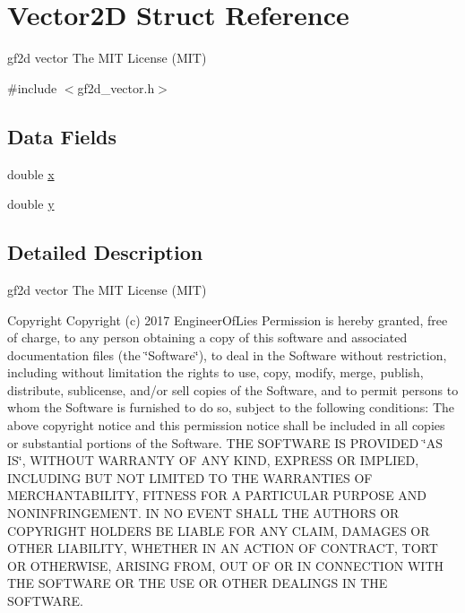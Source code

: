 \hypertarget{struct_vector2_d}{}\section{Vector2D Struct Reference}
\label{struct_vector2_d}


gf2d vector  The M\+IT License (M\+IT)  




{\ttfamily \#include $<$gf2d\+\_\+vector.\+h$>$}

\subsection*{Data Fields}
\begin{DoxyCompactItemize}
\item 
double \hyperlink{struct_vector2_d_af88b946fb90d5f08b5fb740c70e98c10}{x}
\item 
double \hyperlink{struct_vector2_d_ab927965981178aa1fba979a37168db2a}{y}
\end{DoxyCompactItemize}


\subsection{Detailed Description}
gf2d vector  The M\+IT License (M\+IT) 

\begin{DoxyCopyright}{Copyright}
Copyright (c) 2017 Engineer\+Of\+Lies Permission is hereby granted, free of charge, to any person obtaining a copy of this software and associated documentation files (the \char`\"{}\+Software\char`\"{}), to deal in the Software without restriction, including without limitation the rights to use, copy, modify, merge, publish, distribute, sublicense, and/or sell copies of the Software, and to permit persons to whom the Software is furnished to do so, subject to the following conditions\+: The above copyright notice and this permission notice shall be included in all copies or substantial portions of the Software. T\+HE S\+O\+F\+T\+W\+A\+RE IS P\+R\+O\+V\+I\+D\+ED \char`\"{}\+A\+S I\+S\char`\"{}, W\+I\+T\+H\+O\+UT W\+A\+R\+R\+A\+N\+TY OF A\+NY K\+I\+ND, E\+X\+P\+R\+E\+SS OR I\+M\+P\+L\+I\+ED, I\+N\+C\+L\+U\+D\+I\+NG B\+UT N\+OT L\+I\+M\+I\+T\+ED TO T\+HE W\+A\+R\+R\+A\+N\+T\+I\+ES OF M\+E\+R\+C\+H\+A\+N\+T\+A\+B\+I\+L\+I\+TY, F\+I\+T\+N\+E\+SS F\+OR A P\+A\+R\+T\+I\+C\+U\+L\+AR P\+U\+R\+P\+O\+SE A\+ND N\+O\+N\+I\+N\+F\+R\+I\+N\+G\+E\+M\+E\+NT. IN NO E\+V\+E\+NT S\+H\+A\+LL T\+HE A\+U\+T\+H\+O\+RS OR C\+O\+P\+Y\+R\+I\+G\+HT H\+O\+L\+D\+E\+RS BE L\+I\+A\+B\+LE F\+OR A\+NY C\+L\+A\+IM, D\+A\+M\+A\+G\+ES OR O\+T\+H\+ER L\+I\+A\+B\+I\+L\+I\+TY, W\+H\+E\+T\+H\+ER IN AN A\+C\+T\+I\+ON OF C\+O\+N\+T\+R\+A\+CT, T\+O\+RT OR O\+T\+H\+E\+R\+W\+I\+SE, A\+R\+I\+S\+I\+NG F\+R\+OM, O\+UT OF OR IN C\+O\+N\+N\+E\+C\+T\+I\+ON W\+I\+TH T\+HE S\+O\+F\+T\+W\+A\+RE OR T\+HE U\+SE OR O\+T\+H\+ER D\+E\+A\+L\+I\+N\+GS IN T\+HE S\+O\+F\+T\+W\+A\+RE. 
\end{DoxyCopyright}


